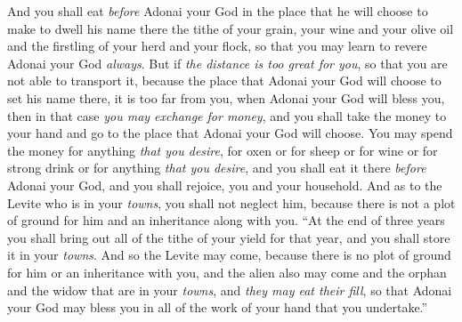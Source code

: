 \begin{biblechapter}
\verse And you shall eat \textit{before} Adonai your God in the place that he will choose to make to dwell his name there the tithe of your grain, your wine and your olive oil and the firstling of your herd and your flock, so that you may learn to revere Adonai your God \textit{always}.
\verse But if \textit{the distance is too great for you}, so that you are not able to transport it, because the place that Adonai your God will choose to set his name there, it is too far from you, when Adonai your God will bless you,
\verse then in that case \textit{you may exchange for money}, and you shall take the money to your hand and go to the place that Adonai your God will choose.
\verse You may spend the money for anything \textit{that you desire}, for oxen or for sheep or for wine or for strong drink or for anything \textit{that you desire}, and you shall eat it there \textit{before} Adonai your God, and you shall rejoice, you and your household.
\verse And as to the Levite who is in your \textit{towns}, you shall not neglect him, because there is not a plot of ground for him and an inheritance along with you.
\verse “At the end of three years you shall bring out all of the tithe of your yield for that year, and you shall store it in your \textit{towns}.
\verse And so the Levite may come, because there is no plot of ground for him or an inheritance with you, and the alien also may come and the orphan and the widow that are in your \textit{towns}, and \textit{they may eat their fill}, so that Adonai your God may bless you in all of the work of your hand that you undertake.”
\end{biblechapter}

